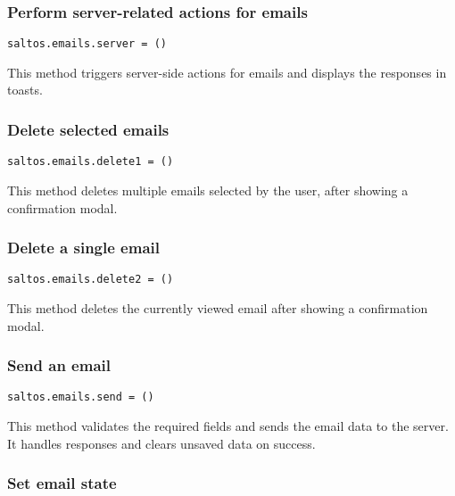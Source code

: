 \documentclass[a4paper]{article}
\begin{document}
\hypertarget{toc52}{}
\subsubsection{Perform server-related actions for emails}

\begin{lstlisting}
saltos.emails.server = ()
\end{lstlisting}

This method triggers server-side actions for emails and displays the responses in toasts.

\hypertarget{toc53}{}
\subsubsection{Delete selected emails}

\begin{lstlisting}
saltos.emails.delete1 = ()
\end{lstlisting}

This method deletes multiple emails selected by the user, after showing a confirmation modal.

\hypertarget{toc54}{}
\subsubsection{Delete a single email}

\begin{lstlisting}
saltos.emails.delete2 = ()
\end{lstlisting}

This method deletes the currently viewed email after showing a confirmation modal.

\hypertarget{toc55}{}
\subsubsection{Send an email}

\begin{lstlisting}
saltos.emails.send = ()
\end{lstlisting}

This method validates the required fields and sends the email data to the server.
It handles responses and clears unsaved data on success.

\hypertarget{toc56}{}
\subsubsection{Set email state}
\end{document}

